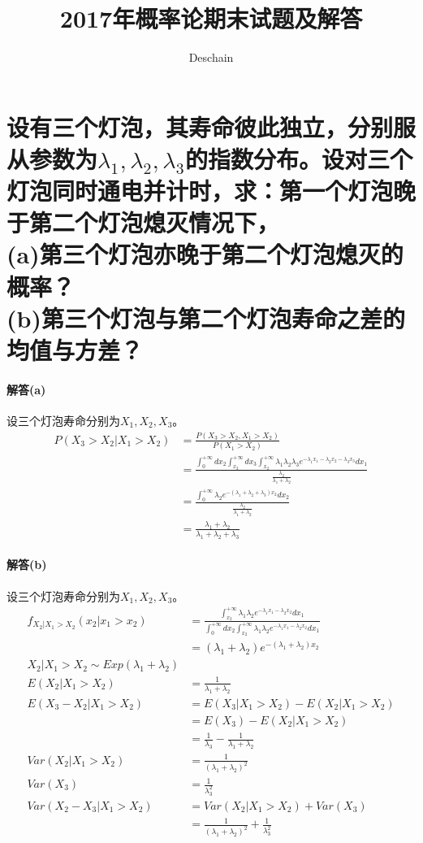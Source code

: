 \documentclass[UTF8]{ctexart}
\title{2017年概率论期末试题及解答}
\author{Deschain}
\begin{document}
\maketitle
\section{设有三个灯泡，其寿命彼此独立，分别服从参数为$\lambda_1,\lambda_2,\lambda_3$的指数分布。设对三个灯泡同时通电并计时，求：第一个灯泡晚于第二个灯泡熄灭情况下，\\
(a)第三个灯泡亦晚于第二个灯泡熄灭的概率？\\
(b)第三个灯泡与第二个灯泡寿命之差的均值与方差？\\}
\paragraph{解答(a)}
设三个灯泡寿命分别为$X_1,X_2,X_3$。
\begin{equation*}
\begin{aligned}
P(X_3>X_2\lvert X_1>X_2)&=\frac{P(X_3>X_2,X_1>X_2)}{P(X_1>X_2)}\\&=\frac{\int_0^{+\infty} dx_2\int_{x_2}^{+\infty}dx_3\int_{x_2}^{+\infty}\lambda_1\lambda_2\lambda_3e^{-\lambda_1x_1-\lambda_2x_2-\lambda_3x_3}dx_1}{\frac{\lambda_2}{\lambda_1+\lambda_2}}\\
&=\frac{\int_0^{+\infty}\lambda_2e^{-(\lambda_1+\lambda_2+\lambda_3)x_2}dx_2}{\frac{\lambda_2}{\lambda_1+\lambda_2}}\\
&=\frac{\lambda_1+\lambda_2}{\lambda_1+\lambda_2+\lambda_3}
\end{aligned}
\end{equation*}
\paragraph{解答(b)}
设三个灯泡寿命分别为$X_1,X_2,X_3$。
\begin{equation*}
\begin{aligned}
f_{X_2\lvert X_1>X_2}(x_2\lvert x_1>x_2)
&=\frac{\int_{x_2}^{+\infty}\lambda_1\lambda_2e^{-\lambda_1x_1-\lambda_2x_2}dx_1}{\int_0^{+\infty}dx_2\int_{x_2}^{+\infty}\lambda_1\lambda_2e^{-\lambda_1x_1-\lambda_2x_2}dx_1}\\
&=(\lambda_1+\lambda_2)e^{-(\lambda_1+\lambda_2)x_2}\\
X_2\lvert X_1>X_2\sim Exp(\lambda_1+\lambda_2)\\
E(X_2\lvert X_1>X_2)
&=\frac{1}{\lambda_1+\lambda_2}\\
E(X_3-X_2\lvert X_1>X_2)
&=E(X_3\lvert X_1>X_2)-E(X_2\lvert X_1>X_2)\\
&=E(X_3)-E(X_2\lvert X_1>X_2)\\
&=\frac{1}{\lambda_3}-\frac{1}{\lambda_1+\lambda_2}\\
Var(X_2\lvert X_1>X_2)
&=\frac{1}{(\lambda_1+\lambda_2)^2}\\
Var(X_3)
&=\frac{1}{\lambda_3^2}\\
Var(X_2-X_3\lvert X_1>X_2)
&=Var(X_2\lvert X_1>X_2)+Var(X_3)\\
&=\frac{1}{(\lambda_1+\lambda_2)^2}+\frac{1}{\lambda_3^2}
\end{aligned}
\end{equation*}
\end{document}
